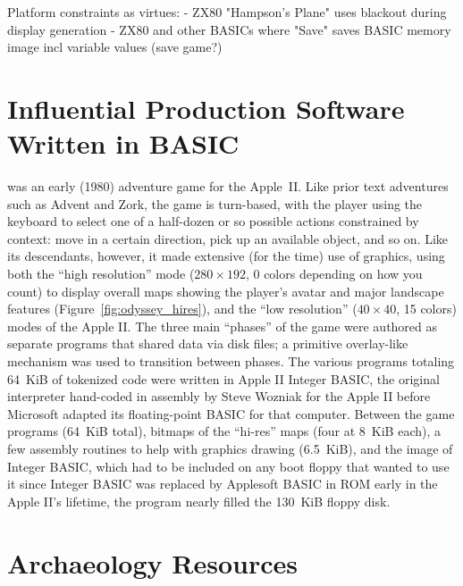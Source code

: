 \documentclass{article}
\begin{document}
Platform constraints as virtues:
 - ZX80 "Hampson's Plane" uses blackout during display generation 
 - ZX80 and other BASICs where "Save" saves BASIC memory image incl
 variable values (save game?)

\section{Influential Production Software Written in BASIC}

 was an early (1980) adventure game
for the Apple~II.
Like prior text adventures such as Advent and Zork, the game is
turn-based, with the player using the 
keyboard to select one of a half-dozen or so possible actions
constrained by context: move in a certain direction, pick up an
available object, and so on.
Like its descendants, however, it made extensive (for the time) use of
graphics, using both the ``high resolution'' mode ($280\times 192$, 0 colors
depending on how you count) to display overall maps showing the player's
avatar and major landscape features (Figure~\ref{fig:odyssey_hires}), and the
``low resolution'' ($40\times 40$, 15
colors) modes of the Apple II.
The three main ``phases'' of the game were authored as separate programs
that shared data via disk files; a primitive overlay-like mechanism was
used to transition between phases.  
The various programs totaling 64~KiB of tokenized code were written in Apple II Integer
BASIC, the
original interpreter hand-coded in assembly by Steve Wozniak for
the Apple II before Microsoft adapted its floating-point BASIC for that
computer.  Between the game programs (64~KiB total), bitmaps of the ``hi-res''
maps (four at 8~KiB each), a few assembly routines to help with graphics
drawing (6.5~KiB), and the image of Integer BASIC, which had to be
included on any boot floppy that wanted to use it since Integer BASIC
was replaced by Applesoft BASIC in ROM early in the Apple II's lifetime,
the program nearly filled the 130~KiB floppy disk.

\section{Archaeology Resources}
\end{document}
